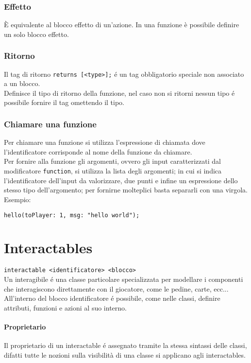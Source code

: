 \subsubsection{Effetto}
È equivalente al blocco effetto di un’azione. 
In una funzione è possibile definire un solo blocco effetto.

\subsubsection{Ritorno}
Il tag di ritorno \lstinline|returns [<type>];| é un tag obbligatorio speciale non associato a un blocco. \\
Definisce il tipo di ritorno della funzione, nel caso non si ritorni nessun tipo é possibile 
fornire il tag omettendo il tipo.

\subsubsection{Chiamare una funzione} \label{ChiamataFunzione}
Per chiamare una funzione si utilizza l'espressione di chiamata dove l'identificatore corrisponde al nome
della funzione da chiamare. \\
Per fornire alla funzione gli argomenti, ovvero gli input caratterizzati dal modificatore \lstinline|function|, si 
utilizza la lista degli argomenti; in cui si indica l'identificatore dell'input da valorizzare, due punti e 
infine un espressione dello stesso tipo dell'argomento; per fornirne molteplici basta separarli con una virgola. Esempio:
\begin{lstlisting}
hello(toPlayer: 1, msg: "hello world");
\end{lstlisting}

\section{Interactables}
\lstinline|interactable <identificatore> <blocco>| \\
Un interagibile é una classe particolare specializzata per modellare i componenti che interagiscono
direttamente con il giocatore, come le pedine, carte, ecc... \\
All'interno del blocco identificatore é possibile, come nelle classi, definire attributi,
funzioni e azioni al suo interno. 

\paragraph{Proprietario}
Il proprietario di un interactable é assegnato tramite la stessa sintassi delle classi,
difatti tutte le nozioni sulla visibilità di una classe si applicano agli interactables.

